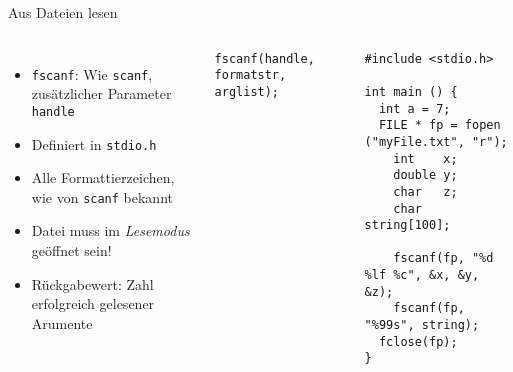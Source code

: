 
\begin{frame}[fragile]{Aus Dateien lesen}
%
\begin{columns}[T]
%
\begin{itemize}
\item \texttt{fscanf}: Wie \texttt{scanf}, zusätzlicher Parameter \texttt{handle}
\item Definiert in \texttt{stdio.h}
\item Alle Formattierzeichen, wie von \texttt{scanf} bekannt
\item Datei muss im \emph{Lesemodus} geöffnet sein!
\item Rückgabewert: Zahl erfolgreich gelesener Arumente
\end{itemize}
%
\begin{codebox}[Syntax]
\begin{verbatim}
fscanf(handle, formatstr, arglist);
\end{verbatim}
\end{codebox}
%
%
\begin{codebox}[Beispiel]
\begin{verbatim}
#include <stdio.h>

int main () {
  int a = 7;
  FILE * fp = fopen ("myFile.txt", "r");
    int    x;
    double y;
    char   z;
    char string[100];
  
    fscanf(fp, "%d %lf %c", &x, &y, &z);
    fscanf(fp, "%99s", string);
  fclose(fp);
}
\end{verbatim}
\end{codebox}
\end{columns}
%
\end{frame}


